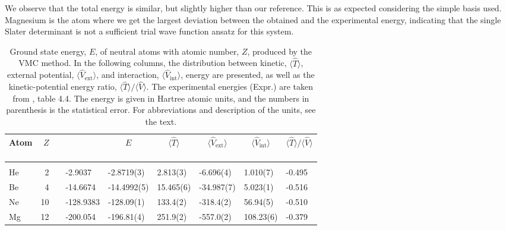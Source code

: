 We observe that the total energy is similar, but slightly higher than our reference. This is as expected considering the simple basis used. Magnesium is the atom where we get the largest deviation between the obtained and the experimental energy, indicating that the single Slater determinant is not a sufficient trial wave function ansatz for this system.

\begin{table}
	\caption{Ground state energy, $E$, of neutral atoms with atomic number, $Z$, produced by the VMC method. In the following columns, the distribution between kinetic, $\langle\hat{T}\rangle$, external potential, $\langle\hat{V}_{\text{ext}}\rangle$, and interaction, $\langle\hat{V}_{\text{int}}\rangle$, energy are presented, as well as the kinetic-potential energy ratio, $\langle\hat{T}\rangle/\langle\hat{V}\rangle$. The experimental energies (Expr.) are taken from \citet{degroote_faddeev_2013}, table 4.4. The energy is given in Hartree atomic units, and the numbers in parenthesis is the statistical error. For abbreviations and description of the units, see the text.}
	\label{tab:atomswinteraction}
	\begin{tabularx}{\textwidth}{lrrR{2cm}R{1.9cm}|R{1.7cm}R{1.7cm}R{1.7cm}R{1.7cm}} \hline\hline
		Atom & $Z$ & \makecell{\\ \phantom{=} \\ \phantom{=}} & 
		 &  &  &  &  &  \\ \hline \\
		
		He & 2 && -2.9037 & -2.8719(3) & 2.813(3) & -6.696(4) & 1.010(7) & -0.495 \\
		Be & 4 && -14.6674 & -14.4992(5) & 15.465(6) & -34.987(7) & 5.023(1) & -0.516 \\
		Ne & 10 && -128.9383 & -128.09(1) & 133.4(2) & -318.4(2) & 56.94(5) & -0.510 \\ 
		Mg & 12 && -200.054 & -196.81(4) & 251.9(2) & -557.0(2) & 108.23(6) & -0.379 \\ \hline\hline
	\end{tabularx}
\end{table}

